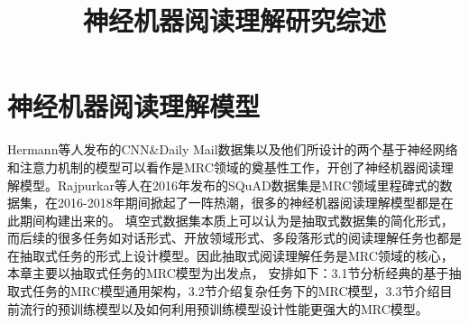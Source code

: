 \documentclass{article}
\title{\heiti \zihao{2} 神经机器阅读理解研究综述}
\date{}
\newcommand{\upcite}[1]{\textsuperscript{\textsuperscript{\cite{#1}}}}
\begin{document}
    \maketitle %

        




																																	



\section{神经机器阅读理解模型}
Hermann等人\upcite{Hermann}发布的CNN\&Daily Mail数据集以及他们所设计的两个基于神经网络和注意力机制的模型可以看作是MRC领域的奠基性工作，开创了神经机器阅读理解模型。Rajpurkar等人\cite{SQuAD1}在2016年发布的SQuAD数据集是MRC领域里程碑式的数据集，在2016-2018年期间掀起了一阵热潮，很多的神经机器阅读理解模型都是在此期间构建出来的。
填空式数据集本质上可以认为是抽取式数据集的简化形式，而后续的很多任务如对话形式、开放领域形式、多段落形式的阅读理解任务也都是在抽取式任务的形式上设计模型。因此抽取式阅读理解任务是MRC领域的核心，本章主要以抽取式任务的MRC模型为出发点，
安排如下：3.1节分析经典的基于抽取式任务的MRC模型通用架构，3.2节介绍复杂任务下的MRC模型，3.3节介绍目前流行的预训练模型以及如何利用预训练模型设计性能更强大的MRC模型。




%



%
%
%




%
%

\end{document}
